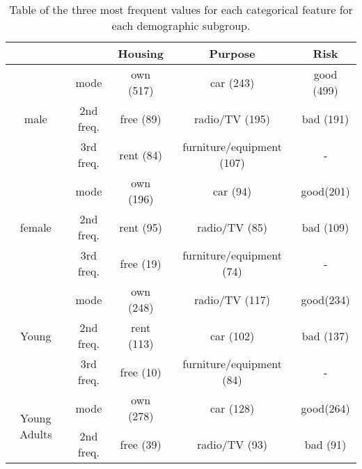 \documentclass[conference]{IEEEtran}
\begin{document}

\begin{table}[ht]
    \begin{center}
    \caption{Table of the three most frequent values for each categorical feature for each demographic subgroup.}
    \begin{tabular}{ |c|c|c|c|c| } 
        \hline
        & & Housing & Purpose & Risk \\ 
        \hline
        \multirow{3}{2.5em}{male} 
        & mode              & own (517) & car (243) & good (499)\\ 
        & 2nd freq. & free (89) & radio/TV (195) & bad (191)\\ 
        & 3rd freq. & rent (84) & furniture/equipment (107) & - \\ 
        \hline
        \multirow{3}{2.5em}{female} 
        & mode              & own (196) & car (94) & good(201) \\ 
        & 2nd freq. & rent (95) & radio/TV (85) & bad (109) \\
        & 3rd freq. & free (19) & furniture/equipment (74) & - \\ 
        \hline
        \multirow{3}{2.5em}{Young} 
        & mode              & own (248)  & radio/TV (117) & good(234) \\ 
        & 2nd freq. & rent (113) & car (102) & bad (137) \\
        & 3rd freq. & free (10)  & furniture/equipment (84) & - \\ 
        \hline
        \multirow{3}{2.5em}{Young Adults} 
        & mode              & own (278) & car (128) & good(264) \\ 
        & 2nd freq. & free (39) & radio/TV (93) & bad (91) \\

\end{tabular}
\end{center}
\end{table}
\end{document}
